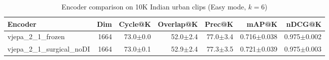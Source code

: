 \begin{table}[ht]
\centering
\caption{Encoder comparison on 10K Indian urban clips (Easy mode, $k=6$)}
\label{tab:encoder_comparison}
\begin{tabular}{lrrrrrr}
\toprule
Encoder & Dim & Cycle@K & Overlap@K & Prec@K & mAP@K & nDCG@K \\
\midrule
vjepa\_2\_1\_frozen & 1664 & 73.0{\tiny$\pm$0.0} & 52.0{\tiny$\pm$2.4} & 77.0{\tiny$\pm$3.4} & 0.716{\tiny$\pm$0.038} & 0.975{\tiny$\pm$0.002} \\
vjepa\_2\_1\_surgical\_noDI & 1664 & 73.0{\tiny$\pm$0.1} & 52.9{\tiny$\pm$2.4} & 77.3{\tiny$\pm$3.5} & 0.721{\tiny$\pm$0.039} & 0.975{\tiny$\pm$0.003} \\
\bottomrule
\end{tabular}
\end{table}